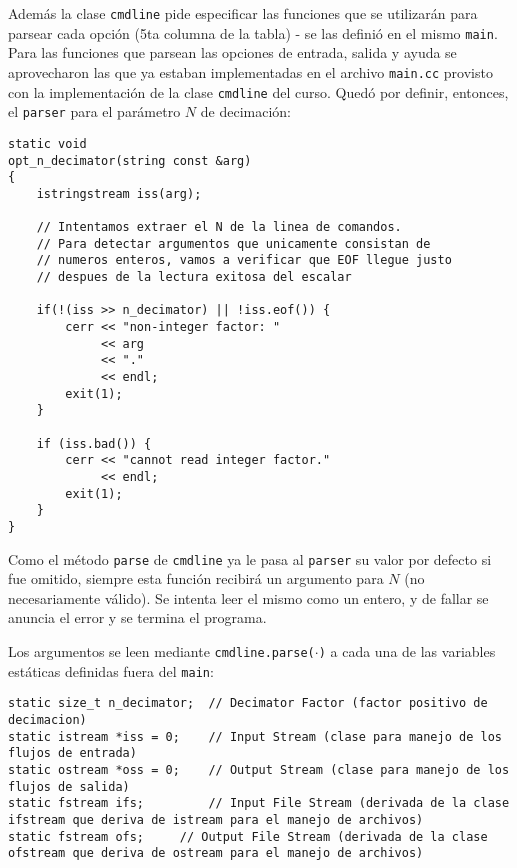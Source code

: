 Además la clase \texttt{cmdline} pide especificar las funciones que se utilizarán para parsear cada opción (5ta columna de la tabla) - se las definió en el mismo \texttt{main}. Para las funciones que parsean las opciones de entrada, salida y ayuda se aprovecharon las que ya estaban implementadas en el archivo \texttt{main.cc} provisto con la implementación de la clase \texttt{cmdline} del curso. Quedó por definir, entonces, el \texttt{parser} para el parámetro $N$ de decimación:


\lstset{language=C++} %
\begin{lstlisting}[frame=single]
static void
opt_n_decimator(string const &arg)
{
	istringstream iss(arg);

	// Intentamos extraer el N de la linea de comandos.
	// Para detectar argumentos que unicamente consistan de
	// numeros enteros, vamos a verificar que EOF llegue justo
	// despues de la lectura exitosa del escalar
	
	if(!(iss >> n_decimator) || !iss.eof()) {
		cerr << "non-integer factor: "
		     << arg
		     << "."
		     << endl;
		exit(1);
	}

	if (iss.bad()) {
		cerr << "cannot read integer factor."
		     << endl;
		exit(1);
	}
}
\end{lstlisting}

Como el método \texttt{parse} de \texttt{cmdline} ya le pasa al \texttt{parser} su valor por defecto si fue omitido, siempre esta función recibirá un argumento para $N$ (no necesariamente válido). Se intenta leer el mismo como un entero, y de fallar se anuncia el error y se termina el programa. 

Los argumentos se leen mediante \texttt{cmdline.parse($\cdot$)} a cada una de las variables estáticas definidas fuera del \texttt{main}:

 
\lstset{language=C++}
\begin{lstlisting}[frame=single]
static size_t n_decimator;	// Decimator Factor (factor positivo de decimacion)
static istream *iss = 0;	// Input Stream (clase para manejo de los flujos de entrada)
static ostream *oss = 0;	// Output Stream (clase para manejo de los flujos de salida)
static fstream ifs; 		// Input File Stream (derivada de la clase ifstream que deriva de istream para el manejo de archivos)
static fstream ofs;		// Output File Stream (derivada de la clase ofstream que deriva de ostream para el manejo de archivos)
\end{lstlisting}

